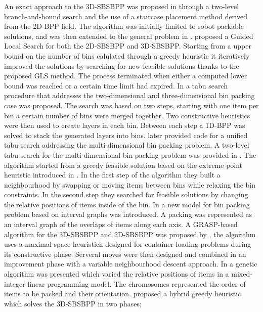 An exact approach to the 3D-SBSBPP was proposed in \cite{martello2000three} through a two-level branch-and-bound search and the use of a staircase placement method derived from the 2D-BPP field.
The algorithm was initially limited to robot packable solutions, and was then extended to the general problem in \cite{martello2007exact}.
\cite{faroe2003guided} proposed a Guided Local Search for both the 2D-SBSBPP and 3D-SBSBPP.
Starting from a upper bound on the number of bins calulated through a greedy heuristic it iteratively improved the solutions by searching for new feasible solutions thanks to the proposed GLS method.
The process terminated when either a computed lower bound was reached or a certain time limit had expired.
In \cite{lodi2002heuristic} a tabu search procedure that addresses the two-dimensional and three-dimensional bin packing case was proposed.
The search was based on two steps, starting with one item per bin a certain number of bins were merged together. 
Two constructive heuristics were then used to create layers in each bin.
Between each step a 1D-BPP was solved to stack the generated layers into bins.
\cite{Lodi2004} later provided code for a unified tabu search addressing the multi-dimensional bin packing problem.
A two-level tabu search for the multi-dimensional bin packing problem was provided in \cite{crainic2009ts2pack}.
The algorithm started from a greedy feasible solution based on the extreme point heuristic introduced in \cite{crainic2008extreme}.
In the first step of the algorithm they built a neighbourhood by swapping or moving items between bins while relaxing the bin constraints.
In the second step they searched for feasible solutions by changing the relative positions of items inside of the bin. %
In \cite{fekete2004combinatorial} a new model for bin packing problem based on interval graphs was introduced. 
A packing was represented as an interval graph of the overlaps of items along each axis.
A GRASP-based algorithm for the 3D-SBSBPP and 2D-SBSBPP was proposed by \cite{parreno2010hybrid}, the algorithm uses a maximal-space heuristich designed for container loading problems during its constructive phase.
Serveral moves were then designed and combined in an improvement phase with a variable neighbourhood descent approach.
In \cite{WU2010347} a genetic algorithm was presented which varied the relative positions of items in a mixed-integer linear programming model. The chromosomes represented the order of items to be packed and their orientation.
\cite{hifi2014hybrid} proposed a hybrid greedy heuristic which solves the 3D-SBSBPP in two phases; 
